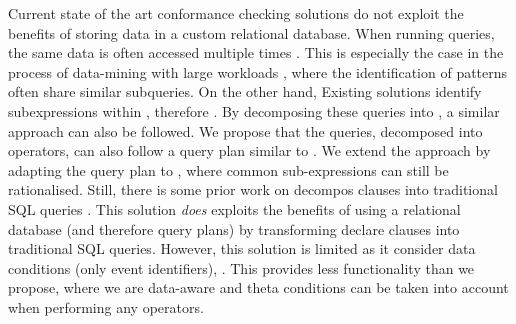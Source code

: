 \iffalse
Current state of the art conformance checking solutions do not exploit the benefits of storing data in a custom relational database. When running queries, the same data is often accessed multiple times \cite{BurattinMS16,bpm21}. This is especially the case in the process of data-mining with large workloads \cite{SchonigRCJM16}, where the identification of patterns often share similar subqueries. On the other hand, Existing solutions  \cite{BellatrecheKB21} identify  sub\RevAdd{-}expressions within , therefore  . By decomposing these queries into \LTLf, a similar approach can also be followed. We propose that the queries, decomposed into \LTLf operators, can also follow a query plan similar to \cite{BellatrecheKB21}. We extend the approach by adapting the query plan to , where common sub-expressions can still be rationalised. Still, there is some prior work on  decompos clauses into traditional SQL queries \cite{SchonigRCJM16}. This solution \emph{does} exploits the benefits of using a relational database (and therefore query plans) by transforming declare clauses into traditional SQL queries. However, this solution is limited as it  consider data conditions (only event identifiers), . This provides less functionality than we propose, where we are data-aware and theta conditions can be taken into account when performing any operators.



